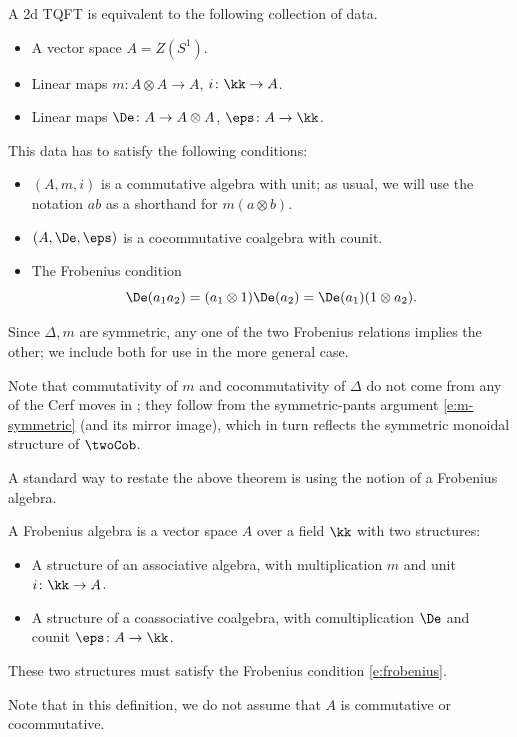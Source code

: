 \begin{theorem}\label{t:2d-classification}
  A 2d TQFT is equivalent to the following collection of data.
  \begin{itemize}
    \item A vector space $A=Z(S^1)$.
    \item Linear maps $m\colon A\otimes A\to A$, $i\colon \kk\to A$.
    \item Linear maps $\De\colon A\to A\otimes A$, $\eps\colon A\to \kk$.
  \end{itemize}
  This data has to satisfy the following conditions:
  \begin{itemize}
    \item $(A,m, i)$ is a commutative algebra with unit; as usual, we will use
      the notation $ab$ as a shorthand for $m(a\otimes b)$.
    \item $(A,\De, \eps)$ is a cocommutative coalgebra with counit.
    \item The Frobenius condition
      \begin{equation}\label{e:frobenius}
        \De(a_1 a_2) = (a_1\otimes 1) \De(a_2)= \De(a_1)(1\otimes a_2).
      \end{equation}
  \end{itemize}
\end{theorem}


\begin{remark}\label{r:frobenius-two}
  Since $\Delta, m$ are symmetric, any one of the two Frobenius relations
  implies the other; we include both for use in the more general case.
\end{remark}




\begin{remark}\label{r:2d-commutative}
  Note that commutativity of $m$ and cocommutativity of $\Delta$ do not come
  from any of the Cerf moves in ; they follow from the
  symmetric-pants argument \eqref{e:m-symmetric} (and its mirror image), which
  in turn reflects the symmetric monoidal structure of $\twoCob$.
\end{remark}



A standard way to restate the above theorem is using the notion of a Frobenius
algebra.
\begin{definition}\label{d:frobenius}
  A Frobenius algebra is a vector space $A$ over a field $\kk$ with two
  structures:
  \begin{itemize}
    \item A structure of an associative algebra, with multiplication $m$ and
      unit $i\colon \kk \to A$.
    \item A structure of a coassociative coalgebra, with comultiplication $\De$
      and counit $\eps\colon A\to \kk$.
  \end{itemize}
  These two structures must satisfy the Frobenius condition \eqref{e:frobenius}.
\end{definition}
Note that in this definition, we do not assume that $A$ is commutative or
cocommutative.

